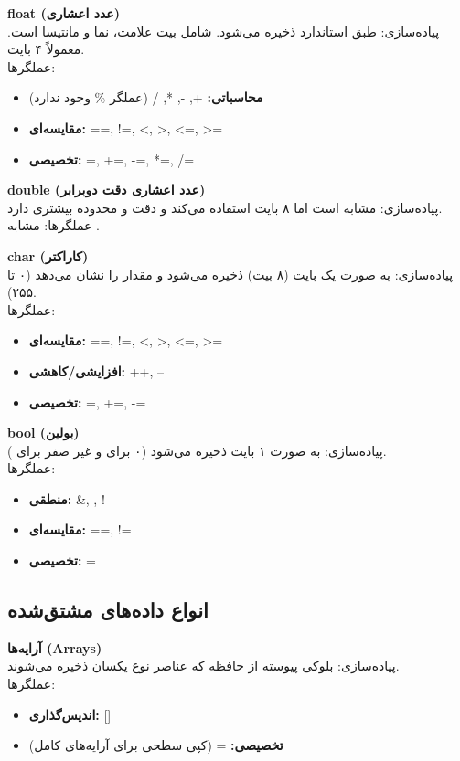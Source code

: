 \documentclass[12pt, a4paper]{report}
\begin{document}
\textbf{float (عدد اعشاری)} \\
پیاده‌سازی: طبق استاندارد  ذخیره می‌شود. شامل بیت علامت، نما و مانتیسا است. معمولاً ۴ بایت. \\
عملگرها:
\begin{itemize}
	\item \textbf{محاسباتی:} +, -, *, / (عملگر \% وجود ندارد)
	\item \textbf{مقایسه‌ای:} ==, !=, <, >, <=, >=
	\item \textbf{تخصیصی:} =, +=, -=, *=, /= 
\end{itemize}

\textbf{double (عدد اعشاری دقت دوبرابر)} \\
پیاده‌سازی: مشابه  است اما ۸ بایت استفاده می‌کند و دقت و محدوده بیشتری دارد. \\
عملگرها: مشابه .

\textbf{char (کاراکتر)} \\
پیاده‌سازی: به صورت یک بایت (۸ بیت) ذخیره می‌شود و مقدار  را نشان می‌دهد (۰ تا ۲۵۵). \\
عملگرها:
\begin{itemize}
	\item \textbf{مقایسه‌ای:} ==, !=, <, >, <=, >=
	\item \textbf{افزایشی/کاهشی:} ++, --
	\item \textbf{تخصیصی:} =, +=, -=
\end{itemize}

\textbf{bool (بولین)} \\
پیاده‌سازی: به صورت ۱ بایت ذخیره می‌شود (۰ برای  و غیر صفر برای ). \\
عملگرها:
\begin{itemize}
	\item \textbf{منطقی:} \&, \textbar, !
	\item \textbf{مقایسه‌ای:} ==, !=
	\item \textbf{تخصیصی:} =
	
\end{itemize}

\subsection{انواع داده‌های مشتق‌شده}

\textbf{آرایه‌ها (Arrays)} \\
پیاده‌سازی: بلوکی پیوسته از حافظه که عناصر نوع یکسان ذخیره می‌شوند. \\
عملگرها:
\begin{itemize}
	\item \textbf{اندیس‌گذاری:} []
	\item \textbf{تخصیصی:} = (کپی سطحی برای آرایه‌های کامل)
\end{itemize}
\end{document}
